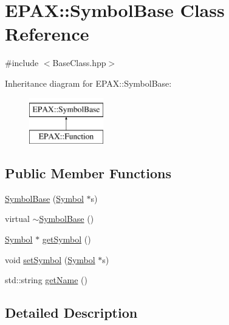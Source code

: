 \hypertarget{class_e_p_a_x_1_1_symbol_base}{\section{\-E\-P\-A\-X\-:\-:\-Symbol\-Base \-Class \-Reference}
\label{class_e_p_a_x_1_1_symbol_base}
}


{\ttfamily \#include $<$\-Base\-Class.\-hpp$>$}

\-Inheritance diagram for \-E\-P\-A\-X\-:\-:\-Symbol\-Base\-:\begin{figure}[H]
\begin{center}
\leavevmode
\includegraphics[height=2.000000cm]{class_e_p_a_x_1_1_symbol_base}
\end{center}
\end{figure}
\subsection*{\-Public \-Member \-Functions}
\begin{DoxyCompactItemize}
\item 
\hyperlink{class_e_p_a_x_1_1_symbol_base_a8f9eba0867c5b241168ee2efd929a6b9}{\-Symbol\-Base} (\hyperlink{class_e_p_a_x_1_1_symbol}{\-Symbol} $\ast$s)
\item 
virtual \hyperlink{class_e_p_a_x_1_1_symbol_base_ae2793fb63d87e3437b77ac5d35258355}{$\sim$\-Symbol\-Base} ()
\item 
\hyperlink{class_e_p_a_x_1_1_symbol}{\-Symbol} $\ast$ \hyperlink{class_e_p_a_x_1_1_symbol_base_aab5102b6c977d0e2572dbbc6d182ae00}{get\-Symbol} ()
\item 
void \hyperlink{class_e_p_a_x_1_1_symbol_base_a2d946999ece0fc16721586357067888b}{set\-Symbol} (\hyperlink{class_e_p_a_x_1_1_symbol}{\-Symbol} $\ast$s)
\item 
std\-::string \hyperlink{class_e_p_a_x_1_1_symbol_base_a85ec412485a26fa166523f3dc0b3fbf2}{get\-Name} ()
\end{DoxyCompactItemize}


\subsection{\-Detailed \-Description}


